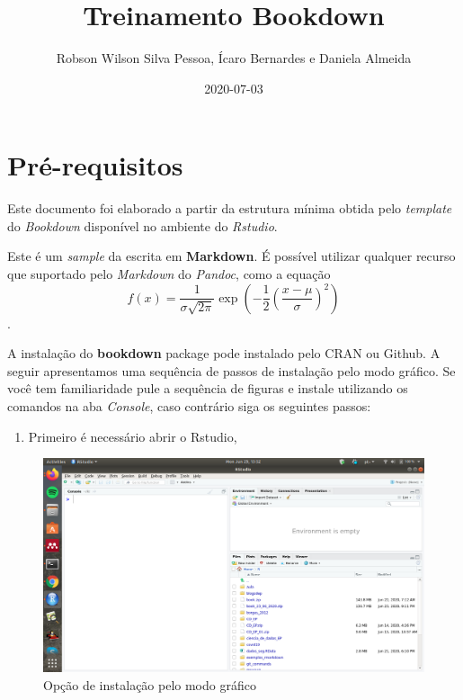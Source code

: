 \documentclass[]{book}
\title{Treinamento Bookdown}
\author{Robson Wilson Silva Pessoa, Ícaro Bernardes e Daniela Almeida}
\date{2020-07-03}
\newenvironment{Shaded}{\begin{snugshade}}{\end{snugshade}}
\newcommand{\KeywordTok}[1]{\textcolor[rgb]{0.13,0.29,0.53}{\textbf{#1}}}
\newcommand{\DataTypeTok}[1]{\textcolor[rgb]{0.13,0.29,0.53}{#1}}
\newcommand{\OtherTok}[1]{\textcolor[rgb]{0.56,0.35,0.01}{#1}}
\newcommand{\OperatorTok}[1]{\textcolor[rgb]{0.81,0.36,0.00}{\textbf{#1}}}
\newcommand{\NormalTok}[1]{#1}
\providecommand{\tightlist}{%
  \setlength{\itemsep}{0pt}\setlength{\parskip}{0pt}}
\begin{document}
\maketitle

{
\setcounter{tocdepth}{1}
\tableofcontents
}
\begin{Shaded}
\end{Shaded}

\chapter{Pré-requisitos}\label{pruxe9-requisitos}

Este documento foi elaborado a partir da estrutura mínima obtida pelo
\emph{template} do \emph{Bookdown} disponível no ambiente do
\emph{Rstudio}.

Este é um \emph{sample} da escrita em \textbf{Markdown}. É possível
utilizar qualquer recurso que suportado pelo \emph{Markdown} do
\emph{Pandoc}, como a equação
\[f(x) = \frac{1}{\sigma\sqrt{2\pi}}\exp\left(-\frac{1}{2}\left(\frac{x-\mu}{\sigma}\right)^2\right)\].

A instalação do \textbf{bookdown} package pode instalado pelo CRAN ou
Github. A seguir apresentamos uma sequência de passos de instalação pelo
modo gráfico. Se você tem familiaridade pule a sequência de figuras e
instale utilizando os comandos na aba \emph{Console}, caso contrário
siga os seguintes passos:

\begin{enumerate}
\def\labelenumi{\arabic{enumi}.}
\tightlist
\item
  Primeiro é necessário abrir o Rstudio,
\end{enumerate}

\begin{figure}
\centering
\includegraphics{fig/open_Rstudio.png}
\caption{Opção de instalação pelo modo gráfico}
\end{figure}
\end{document}
